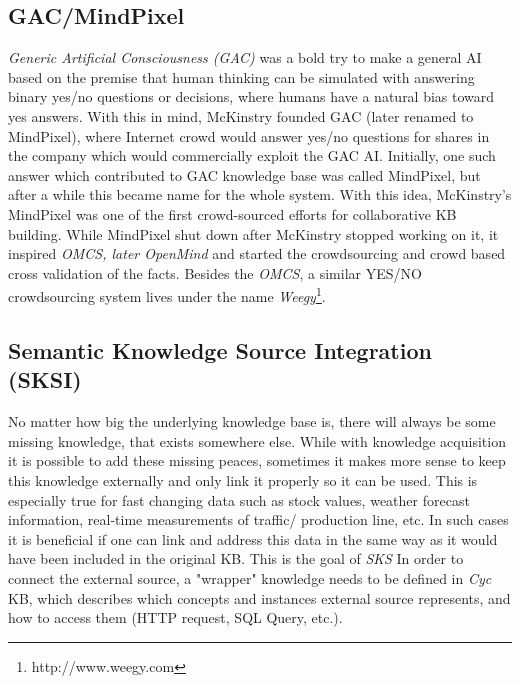 \subsection{GAC/MindPixel}
\label{section:r:gac}
\emph{Generic Artificial Consciousness (GAC)} was a bold try to make a general
AI based on
the premise that human thinking can be simulated with answering binary yes/no
questions or decisions\parencite{McKinstry2008}, where humans have a natural 
bias toward yes answers. With this in mind, McKinstry founded GAC (later renamed
to MindPixel), where Internet crowd would answer yes/no questions for shares
in the company which would commercially exploit the GAC AI. Initially, one such
answer which contributed to GAC knowledge base was called MindPixel, but after
a while this became name for the whole system. With this idea, McKinstry's
MindPixel was one of the first crowd-sourced efforts for collaborative KB
building. While MindPixel shut down after McKinstry stopped working on it,
it inspired \emph{OMCS, later OpenMind} and started the crowdsourcing and
crowd based cross validation of the facts. Besides the \emph{OMCS}, a similar
YES/NO crowdsourcing system lives under the name 
\emph{Weegy}\footnote{http://www.weegy.com}.

\subsection{Semantic Knowledge Source Integration (SKSI)}
\label{section:r:sksi}
No matter how big the underlying knowledge base is, there will always be some
missing knowledge, that exists somewhere else. While with knowledge acquisition
it is possible to add these missing peaces, sometimes it makes more sense to
keep this knowledge externally and only link it properly so it can be used.
This is especially true for fast changing data such as stock values, weather
forecast information, real-time measurements of traffic/ production line, etc.
In such cases it is beneficial if one can link and address this data in the 
same way as it would have been included in the original KB. This is the goal
of \emph{SKS}\parencite{Masters2007}
In order to connect the external source, a "wrapper" knowledge needs to be
defined in \emph{Cyc} KB, which describes which concepts and instances external
source represents, and how to access them (HTTP request, SQL Query, etc.).

